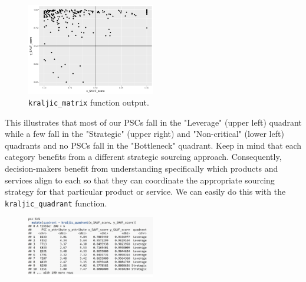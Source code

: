 \documentclass[twocolumn]{svjour3}       %
\begin{document}
\begin{figure}[!htb]
  \includegraphics[width=0.5\textwidth]{fig5.png}
  \caption{\texttt{kraljic\_matrix} function output.}
  \label{fig:5}
\end{figure}

This illustrates that most of our PSCs fall in the "Leverage" (upper left) quadrant while a few fall in the "Strategic" (upper right) and "Non-critical" (lower left) quadrants and no PSCs fall in the "Bottleneck" quadrant. Keep in mind that each category benefits from a different strategic sourcing approach. Consequently, decision-makers benefit from understanding specifically which products and services align to each so that they can coordinate the appropriate sourcing strategy for that particular product or service. We can easily do this with the \texttt{kraljic\_quadrant} function.
\begin{figure}[!htb]
  \includegraphics[width=0.5\textwidth]{code10.png}
\end{figure}
\end{document}
